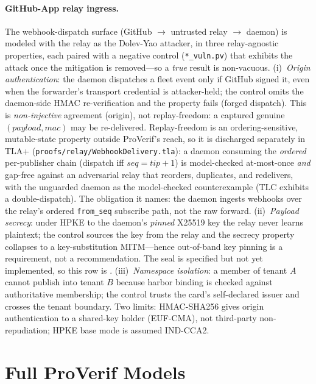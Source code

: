 \documentclass[11pt,a4paper]{article}
\theoremstyle{definition}
\begin{document}
\paragraph{GitHub-App relay ingress.} The webhook-dispatch surface (GitHub $\to$ untrusted relay $\to$ daemon) is modeled with the relay as the Dolev-Yao attacker, in three relay-agnostic properties, each paired with a negative control (\texttt{*\_vuln.pv}) that exhibits the attack once the mitigation is removed---so a \emph{true} result is non-vacuous. (i)~\emph{Origin authentication}: the daemon dispatches a fleet event only if GitHub signed it, even when the forwarder's transport credential is attacker-held; the control omits the daemon-side HMAC re-verification and the property fails (forged dispatch). This is \emph{non-injective} agreement (origin), not replay-freedom: a captured genuine $(\textit{payload},\textit{mac})$ may be re-delivered. Replay-freedom is an ordering-sensitive, mutable-state property outside ProVerif's reach, so it is discharged separately in TLA+ (\texttt{proofs/relay/WebhookDelivery.tla}): a daemon consuming the \emph{ordered} per-publisher chain (dispatch iff $\textit{seq}=\textit{tip}+1$) is model-checked at-most-once \emph{and} gap-free against an adversarial relay that reorders, duplicates, and redelivers, with the unguarded daemon as the model-checked counterexample (TLC exhibits a double-dispatch). The obligation it names: the daemon ingests webhooks over the relay's ordered \texttt{from\_seq} subscribe path, not the raw forward. (ii)~\emph{Payload secrecy}: under HPKE to the daemon's \emph{pinned} X25519 key the relay never learns plaintext; the control sources the key from the relay and the secrecy property collapses to a key-substitution MITM---hence out-of-band key pinning is a requirement, not a recommendation. The seal is specified but not yet implemented, so this row is \Partial. (iii)~\emph{Namespace isolation}: a member of tenant $A$ cannot publish into tenant $B$ because harbor binding is checked against authoritative membership; the control trusts the card's self-declared issuer and crosses the tenant boundary. Two limits: HMAC-SHA256 gives origin authentication to a shared-key holder (EUF-CMA), not third-party non-repudiation; HPKE base mode is assumed IND-CCA2.



\section{Full ProVerif Models}\label{app:proverif}
\end{document}
